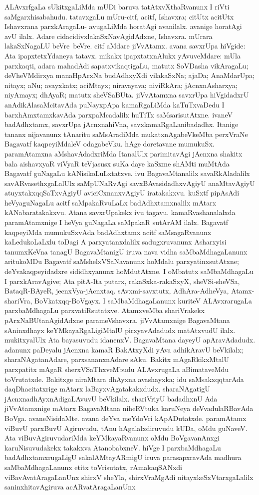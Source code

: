 ALAvxrfgaLa sUkitxgaLiMda mUDi baruva tatAtxvXthaRvanunx I riVti saMgarxhisa\-bahudu. tatavxgaLu mUru-citf, acitf, Ishavxra; citUtx acitUtx Ishavxrana parxkAra\-gaLu- avugaLiMda horatAgi avanilalx. avanige horatAgi avU ilalx. Adare cidacidivxlakaSxNavAgidAdxne, Ishavxra. mUrara lakaSxNagaLU \hbox{beVre beVre}. citf aMdare jiVvAtamx. avana savxrUpa hiVgide: Ata ipapxtetxYdaneya tatavx. mikakx ipapxtatxnAlukx yAvuveMdare: mUla parxkaqti, adara mahadAdi sapatxvikaqtigaLu, matutx SoVDasha vikAragaLu; deVheVMdirxya manaHpArxNa budAdhxyXdi vilakaSxNa; ajaDa; AnaMdarUpa; nitayx; aNu; avayxkatx; aciMtayx; niravayava; niviRkAra; jAcnxnAsharxya; niyAmayx; dhAyaR; matutx sheVSaBUta. jiVvAtamxna savxrUpa hiVgidadxrU anAdikAlasaMcitavAda puNayxpApa kamaRgaLiMda kaTuTxvaDedu I barxhAmxtamxkavAda parxpaMcadalilx huTiTx saMsarisutAtxne. ivaneV badAdhxtamx, savxrUpa jAcnxnahiVna, savxkamaRgaLanibadadhx. Itanige tananx nijavanunx tAnaritu saMsAradiMda mukatxnAgabeVkeMba perxVraNe Bagavatf kaqpeyiMdaleV odagabeVku. hAge doretavane mumukuSx. paramAtamxna aMshavAdadxriMda ItanalUlx parimitavAgi jAcnxna shakitx bala aishavxyaR viVyaR teVjasusx suKa daye kaSxme shAMti muMtAda Bagavatf guNagaLu kANisikoLuLxtatxve. ivu BagavaMtanalilx savaRkAladalilx savARvasethxgaLalUlx saMpUNaRvAgi savxBAvasidadhxvAgiyU anaMtavAgiyU atuyxtakxqqSaTxvAgiyU aviciCxnanxvAgiyU iratakakxvu. kuSxtf pipAsAdi heVyaguNagaLu acitf saMpakaRvuLaLx badAdhxtamxnalilx mAtarx kANabaratakakxvu. Atana savxrUpakekx ivu tagavu. kamaRvashanalalxda paramAtamxnige I heVya guNagaLa saMpakaR sutArAM ilalx. Bagavatf kaqpeyiMda mumukuSxvAda badAdhxtamx acitf saMsagaRvanunx kaLedukoLaLxlu toDagi A parxyatanxdalilx sadugxruvanunx Asharxyisi tanumxKeVna tanagU BagavaMtanigU iruva nava vidha saMbaMdhagaLanunx aritukoMDu Bagavatf saMshelxVSaNavanunx hoMdalu parxyatinxsutAtxne; deYvakaqpeyidadxre sididhxyanunx hoMdutAtxne. I oMbatutx saMbaMdhagaLu I parxkAravAgive; Ata pitA-Ita putarx, rakaSxka-rakaSxyX, sheVSi-sheVSa, BataqR-BAyeR, jecnxVya-jAcnxtaq. sAvxmi-savxtutx, AdhAra-AdheVya, Atamx-shariVra, BoVkatxqq-BoVgayx. I saMbaMdhagaLanunx kuriteV ALAvxrarugaLa parxbaMdhagaLu parxvatiRsutatxve. AtamxveMba shariVrakekx pArxNaBUtanAgidAdxne parameVshavxra. jiVvAtamxnige BagavaMtana sAninxdhayx keYMkayaRgaLigiMtalU pirxyavAdadudx matAtxvudU ilalx. mukitxyalUlx Ata bayasuvudu idanenxV. BagavaMtana dayeyU apAravAdadudx. adanunx paDeyalu jAcnxna kamaR BakAtxyXdi yAva adhikAravU beVkilalx; sharaNAgatanAdare, parxsananxnAdare sAku. Bakitx mAgaRkikxMtalU parxpatitx mAgaR sherxVSaThxveMbudu ALAvxrugaLa aBimataveMdu toVrutatxde. Bakitxge niraMtara dhAyxna avashayxka; idu saMsakxqqtarAda daqDhacitatxrige mAtarx laBayxvAgatakakxdudx. sharaNAgatigU jAcnxnadhAyxnAdigaLAvuvU beVkilalx. shariVriyU badadhxnU Ada jiVvAtamxnige mAtarx BagavaMtana niheRVtuka karuNeya deVvadulaRBavAda BoVga. avaneNisidaMte. avana deYva meYdoVri kApADutatxde. paramAtamx viBuvU parxBuvU Agiruvudu, tAnu hAgalalxdiruvudu kUDa, oMdu guNaveV. Ata viBuvAgiruvudariMda keYMkayaRvanunx oMdu BoVgavanAnxgi karuNisuvudakekx takakxva AtanobabxneV. hiVge I parxbaMdhagaLu badAdhxtamxrugaLigU sakalAMtayARmigU iruva parasapxravAda madhura saMbaMdhagaLanunx etitx toVrisutatx, rAmakaqSANxdi viBavAvatAragaLanUnx shirxV sheYla, shirxVraMgAdi nitayxkeSxVtarxgaLalilx saninxhitavAgiruva acARvatAragaLanUnx 